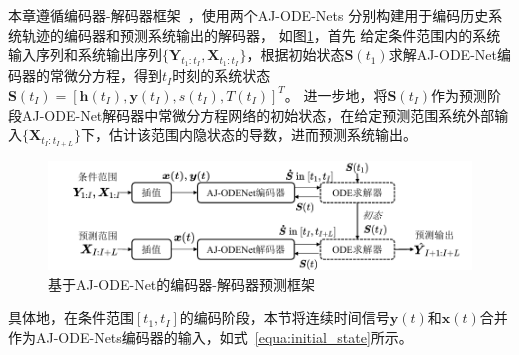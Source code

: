 本章遵循编码器-解码器框架~\cite{du2020multivariate,yuan2020dual}，使用两个AJ-ODE-Nets
分别构建用于编码历史系统轨迹的编码器和预测系统输出的解码器，
如图\ref{fig:AJ-ODE-Net_framework}，首先
给定条件范围内的系统输入序列和系统输出序列$\{{\boldsymbol{Y}}_{t_{1}:t_{I}}, {\boldsymbol {X}}_{t_{1}:t_{I}}\}$，根据初始状态$\boldsymbol S(t_1)$求解AJ-ODE-Net编码器的常微分方程，得到$t_I$时刻的系统状态$\boldsymbol S(t_I)=[\boldsymbol h(t_I), \boldsymbol y(t_I), s(t_I), T(t_I)]^T$。
进一步地，将$\boldsymbol S(t_I)$作为预测阶段AJ-ODE-Net解码器中常微分方程网络的初始状态，在给定预测范围系统外部输入$\{{\boldsymbol {X}}_{t_{I}:t_{I+L}}\}$下，估计该范围内隐状态的导数，进而预测系统输出。
\begin{figure}[htb]
    \centering
    \includegraphics[width=1.0\linewidth]{figures/chapter4/Jump-ODEnet_flow.pdf}
     \caption{基于AJ-ODE-Net的编码器-解码器预测框架}
    \label{fig:AJ-ODE-Net_framework}
\end{figure}



具体地，在条件范围$[t_1, t_I]$的编码阶段，本节将连续时间信号$\boldsymbol y(t)$和$\boldsymbol x(t)$合并作为AJ-ODE-Nets编码器的输入，如式~\eqref{equa:initial_state}所示。

